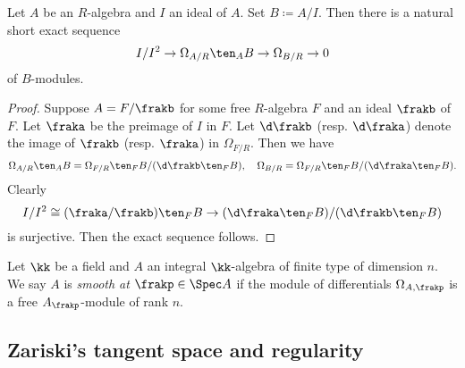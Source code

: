     \begin{theorem}\label{thm: the second exact sequence of differentials}
        Let \(A\) be an \(R\)-algebra and \(I\) an ideal of \(A\).
        Set \(B \coloneqq A/I\).
        Then there is a natural short exact sequence
        \[ I/I^2 \to \Omega_{A/R} \ten_A B \to \Omega_{B/R} \to 0 \]
        of \(B\)-modules.
    \end{theorem}
    \begin{proof}
        Suppose \(A = F/\frakb\) for some free \(R\)-algebra \(F\) and an ideal \(\frakb\) of \(F\).
        Let \(\fraka\) be the preimage of \(I\) in \(F\).
        Let \(\d \frakb\) (resp. \(\d \fraka\)) denote the image of \(\frakb\) (resp. \(\fraka\)) in \(\Omega_{F/R}\).
        Then we have 
        \[ \Omega_{A/R} \ten_A B = \Omega_{F/R} \ten_F B / (\d \frakb \ten_F B), \quad \Omega_{B/R} = \Omega_{F/R} \ten_F B / (\d \fraka \ten_F B). \]
        Clearly 
        \[ I/I^2 \cong (\fraka/\frakb)\ten_F B \to (\d \fraka \ten_F B)/(\d \frakb \ten_F B) \]
        is surjective.
        Then the exact sequence follows.
    \end{proof}

    \begin{definition}\label{def: smoothness of affine algebraic varieties}
        Let \(\kk\) be a field and \(A\) an integral \(\kk\)-algebra of finite type of dimension $n$.
        We say \(A\) is \emph{smooth at \(\frakp \in \Spec A\)} if the module of differentials \(\Omega_{A,\frakp}\) is a free \(A_\frakp\)-module of rank \(n\).
    \end{definition}


\subsection{Zariski's tangent space and regularity}


